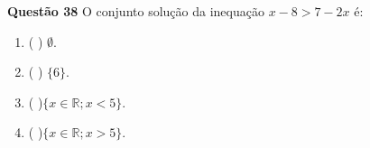 {\bf Questão 38} 
O conjunto solução da inequação
 $x-8 > 7-2x$ é:
\begin{multicols}{2}
\begin{enumerate}
		\item ( ) $\emptyset$.
		\item ( ) $\{6\}$.
		\item ( )$\{x \in \mathbb{R}; x < 5\}$.
		\item ( )$\{x \in \mathbb{R}; x > 5\}$.
\end{enumerate}
\end{multicols}
